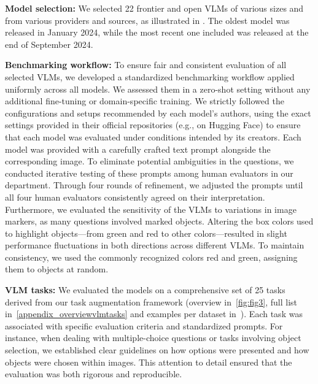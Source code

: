 \textbf{Model selection:}
We selected 22 frontier and open VLMs of various sizes and from various providers and sources, as illustrated in . The oldest model was released in January 2024, while the most recent one included was released at the end of September 2024.

 \textbf{Benchmarking workflow:} 
 To ensure fair and consistent evaluation of all selected VLMs, we developed a standardized benchmarking workflow applied uniformly across all models. We assessed them in a zero-shot setting without any additional fine-tuning or domain-specific training. We strictly followed the configurations and setups recommended by each model's authors, using the exact settings provided in their official repositories (e.g., on Hugging Face) to ensure that each model was evaluated under conditions intended by its creators. Each model was provided with a carefully crafted text prompt alongside the corresponding image. 
To eliminate potential ambiguities in the questions, we conducted iterative testing of these prompts among human evaluators in our department. Through four rounds of refinement, we adjusted the prompts until all four human evaluators consistently agreed on their interpretation. Furthermore, we evaluated the sensitivity of the VLMs to variations in image markers, as many questions involved marked objects. Altering the box colors used to highlight objects—from green and red to other colors—resulted in slight performance fluctuations in both directions across different VLMs. To maintain consistency, we used the commonly recognized colors red and green, assigning them to objects at random.


\textbf{VLM tasks:} We evaluated the models on a comprehensive set of 25 tasks derived from our task augmentation framework (overview in~\cref{fig:fig3}, full list in~\cref{appendix_overviewvlmtasks} and examples per dataset in~). Each task was associated with specific evaluation criteria and standardized prompts. For instance, when dealing with multiple-choice questions or tasks involving object selection, we established clear guidelines on how options were presented and how objects were chosen within images. This attention to detail ensured that the evaluation was both rigorous and reproducible.




